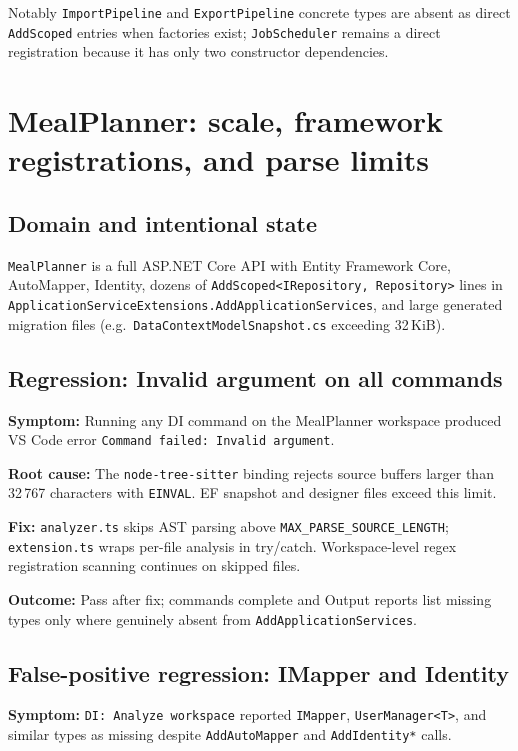 Notably \texttt{ImportPipeline} and \texttt{ExportPipeline} concrete types are absent as direct \texttt{AddScoped} entries when factories exist; \texttt{JobScheduler} remains a direct registration because it has only two constructor dependencies.

\section{MealPlanner: scale, framework registrations, and parse limits}
\label{chap5:mealplanner}

\subsection{Domain and intentional state}

\texttt{MealPlanner} is a full ASP.NET Core API with Entity Framework Core, AutoMapper, Identity, dozens of \texttt{AddScoped<IRepository, Repository>} lines in \texttt{ApplicationServiceExtensions.AddApplicationServices}, and large generated migration files (e.g.\ \texttt{DataContextModelSnapshot.cs} exceeding 32\,KiB).

\subsection{Regression: Invalid argument on all commands}

\textbf{Symptom:} Running any DI command on the MealPlanner workspace produced VS Code error \texttt{Command failed: Invalid argument}.

\textbf{Root cause:} The \texttt{node-tree-sitter} binding rejects source buffers larger than 32\,767 characters with \texttt{EINVAL}. EF snapshot and designer files exceed this limit.

\textbf{Fix:} \texttt{analyzer.ts} skips AST parsing above \texttt{MAX\_PARSE\_SOURCE\_LENGTH}; \texttt{extension.ts} wraps per-file analysis in try/catch. Workspace-level regex registration scanning continues on skipped files.

\textbf{Outcome:} Pass after fix; commands complete and Output reports list missing types only where genuinely absent from \texttt{AddApplicationServices}.

\subsection{False-positive regression: IMapper and Identity}

\textbf{Symptom:} \texttt{DI: Analyze workspace} reported \texttt{IMapper}, \texttt{UserManager<T>}, and similar types as missing despite \texttt{AddAutoMapper} and \texttt{AddIdentity*} calls.

